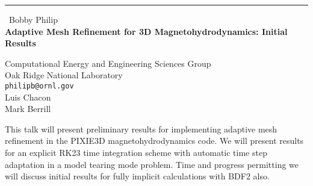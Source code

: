 \documentclass{report}
\begin{document}
\begin{center}
\rule{6in}{1pt} \
{\large Bobby Philip \\
{\bf Adaptive Mesh Refinement for 3D Magnetohydrodynamics: Initial Results}}

Computational Energy and Engineering Sciences Group \\ Oak Ridge National Laboratory
\\
{\tt philipb@ornl.gov}\\
Luis Chacon\\
Mark Berrill\end{center}

This talk will present preliminary results for implementing adaptive mesh
refinement in the PIXIE3D magnetohydrodynamics code. We will present
results for an explicit RK23 time integration scheme with automatic time
step adaptation in a model tearing mode problem. Time and progress
permitting we will discuss initial results for fully implicit
calculations with BDF2 also.
\end{document}
